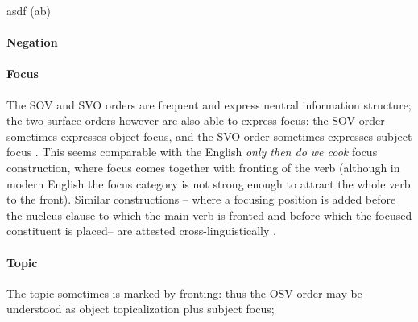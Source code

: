 \documentclass[a4paper, oneside, 12pt]{report}
\newcommand*{\citetable}[1]{Table~{#1}}
\newcommand*{\citepage}[1]{p.~{#1}}
\newcommand{\form}[1]{\emph{#1}}
\newcommand{\source}[1]{\hspace{\fill}\mbox{}\linebreak[0]\hspace*{\fill}\mbox{(\small #1)}}
\begin{document}
\begin{exe}
    \ex asdf \source{ab}
\end{exe}

\paragraph*{Negation} 

\paragraph*{Focus} The SOV and SVO orders are frequent and express neutral information structure; 
the two surface orders however 
are also able to express focus:
the SOV order sometimes expresses object focus, 
and the SVO order sometimes expresses subject focus
\citep[\citetable{27.1}]{forker2020grammar}.
This seems comparable with the English 
\form{only then do we cook} focus construction,
where focus comes together with fronting of the verb 
(although in modern English the focus category is not strong enough 
to attract the whole verb to the front).
Similar constructions -- where a focusing position is added before the nucleus clause 
to which the main verb is fronted and before which the focused constituent is placed-- 
are attested cross-linguistically \citep[\citepage{521}]{forker2020grammar}.


\paragraph*{Topic} The topic sometimes is marked by fronting:
thus the OSV order may be understood as 
object topicalization plus subject focus;



\end{document}
